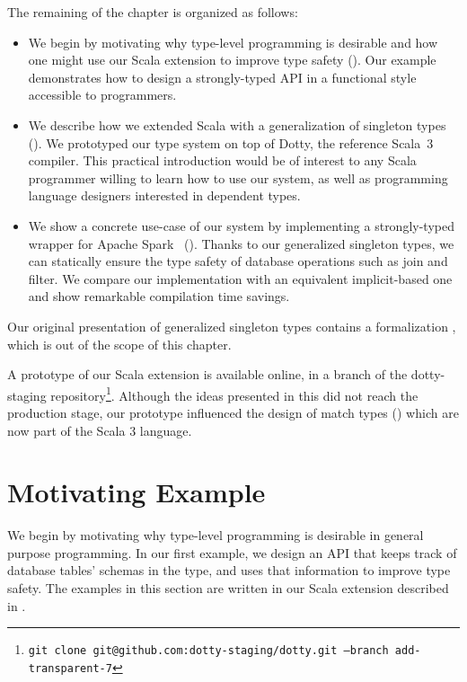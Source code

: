 The remaining of the chapter is organized as follows:

\begin{itemize}
\item
  We begin by motivating why type-level programming is desirable and how one might use our Scala extension to improve type safety (). Our example demonstrates how to design a strongly-typed API in a functional style accessible to programmers.
\item
  We describe how we extended Scala with a generalization of singleton types ().
  We prototyped our type system on top of Dotty, the reference Scala~3 compiler.
  This practical introduction would be of interest to any Scala programmer willing to learn how to use our system, as well as programming language designers interested in dependent types.
\item
  We show a concrete use-case of our system by implementing a strongly-typed wrapper for Apache Spark~\citep{zaharia2016apache} ().
  Thanks to our generalized singleton types, we can statically ensure the type safety of database operations such as join and filter.
  We compare our implementation with an equivalent implicit-based one and show remarkable compilation time savings.
\end{itemize}

Our original presentation of generalized singleton types contains a formalization \citep[Section 3 and 4]{schmid2020coming}, which is out of the scope of this chapter.

A prototype of our Scala extension is available online, in a branch of the dotty-staging repository\footnote{\texttt{git clone git@github.com:dotty-staging/dotty.git --branch add-transparent-7}}.
Although the ideas presented in this did not reach the production stage, our prototype influenced the design of match types () which are now part of the Scala 3 language.

\section{Motivating Example}
\label{sec:motivating-example}

We begin by motivating why type-level programming is desirable in general purpose programming.
In our first example, we design an API that keeps track of database tables' schemas in the type, and uses that information to improve type safety.
The examples in this section are written in our Scala extension described in .

